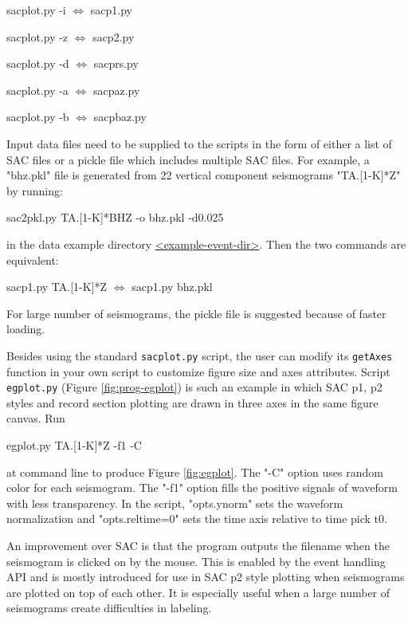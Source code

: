 \documentclass[12pt, titlepage]{article}
\newenvironment{lyxcode}
{\begin{list}{}{
\setlength{\rightmargin}{\leftmargin}
\setlength{\listparindent}{0pt}%
\raggedright
\setlength{\itemsep}{0pt}
\setlength{\parsep}{0pt}
\normalfont\ttfamily}%
 \item[]}
{\end{list}}
\begin{document}
\begin{lyxcode}
sacplot.py -i     $\Longleftrightarrow$   sacp1.py

sacplot.py -z    $\Longleftrightarrow$   sacp2.py

sacplot.py -d    $\Longleftrightarrow$   sacprs.py

sacplot.py -a    $\Longleftrightarrow$   sacpaz.py

sacplot.py -b    $\Longleftrightarrow$   sacpbaz.py

\end{lyxcode}


Input data files need to be supplied to the scripts in the form of either a list of SAC files or a pickle file which includes multiple SAC files. For example, a "bhz.pkl" file is generated from 22 vertical component seismograms "TA.[1-K]*Z" by running:

\begin{lyxcode}
sac2pkl.py TA.[1-K]*BHZ -o bhz.pkl -d0.025
\end{lyxcode}

in the data example directory \url{<example-event-dir>}. Then the two commands are equivalent:

\begin{lyxcode}
sacp1.py TA.[1-K]*Z    $\Longleftrightarrow$   sacp1.py bhz.pkl
\end{lyxcode}

For large number of seismograms, the pickle file is suggested because of faster loading.


Besides using the standard \texttt{sacplot.py} script, the user can modify its \texttt{getAxes} function in your own script to customize figure size and axes attributes.
Script \texttt{egplot.py} (Figure \ref{fig:prog-egplot}) is such an example in which SAC p1, p2 styles and record section plotting are drawn in three axes in the same figure canvas. Run

\begin{lyxcode}
egplot.py TA.[1-K]*Z  -f1 -C
\end{lyxcode}

at command line to produce Figure \ref{fig:egplot}.
The "-C" option uses random color for each seismogram.
The "-f1" option fills the positive signals of waveform with less transparency.  
In the script, "opts.ynorm" sets the waveform normalization and "opts.reltime=0" sets the time axis relative to time pick t0.


An improvement over SAC is that the program outputs the filename when the seismogram is clicked on by the mouse. This is enabled by the event handling API and is mostly introduced for use in SAC p2 style plotting when seismograms are plotted on top of each other. It is especially useful when a large number of seismograms create difficulties in labeling.
\end{document}
